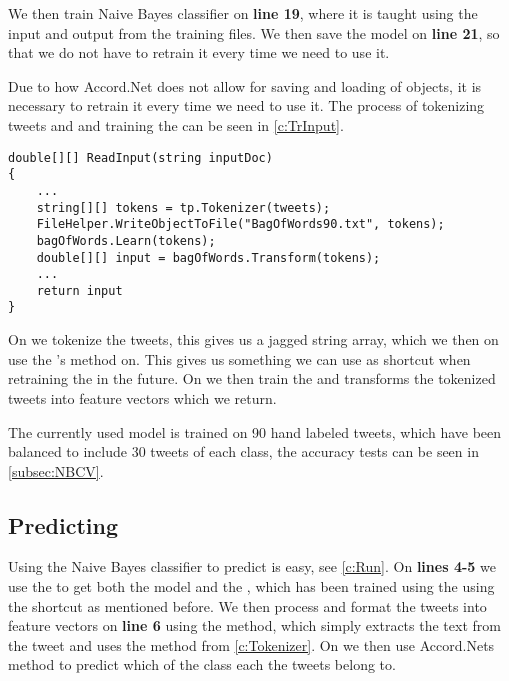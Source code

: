 We then train Naive Bayes classifier on \textbf{line 19}, where it is taught
using the input and output from the training files. We then save the model on
\textbf{line 21}, so that we do not have to retrain it every time we need to use
it.\nl

Due to how Accord.Net does not allow for saving and loading of
 objects, it is necessary to retrain it every time we need to
use it. The process of tokenizing tweets and and training the 
can be seen in \autoref{c:TrInput}.\nl

\begin{minipage}[H]{\linewidth}
\begin{lstlisting}[caption = Create and train the bag of words, label =
c:TrInput] 
double[][] ReadInput(string inputDoc)
{
    ...
    string[][] tokens = tp.Tokenizer(tweets);
    FileHelper.WriteObjectToFile("BagOfWords90.txt", tokens);
    bagOfWords.Learn(tokens);
    double[][] input = bagOfWords.Transform(tokens);
    ...
	return input
}
\end{lstlisting}
\end{minipage}

On  we tokenize the tweets, this gives us a jagged string array,
which we then on  use the
's  method on.
This gives us something we can use as shortcut when retraining the
 in the future. On  we then train the
 and transforms the tokenized tweets into feature vectors
which we return.\nl

The currently used model is trained on 90 hand labeled tweets, which have been
balanced to include 30 tweets of each class, the accuracy tests can be seen in
\autoref{subsec:NBCV}.

\subsection{Predicting}
Using the Naive Bayes classifier to predict is easy, see \autoref{c:Run}. On
\textbf{lines 4-5} we use the  to get both the model and
the , which has been trained using the using the shortcut as
mentioned before. We then process and format the tweets into feature vectors on
\textbf{line 6} using the  method, which simply extracts the
text from the tweet and uses the  method from
\autoref{c:Tokenizer}. On  we then use Accord.Nets 
method to predict which of the class each the tweets belong to.

